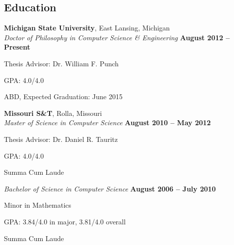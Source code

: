 \documentclass[margin,line]{resume}
\begin{document}
\begin{resume}
    \section{\mysidestyle Education}
    \textbf{Michigan State University}, East Lansing, Michigan \vspace{2mm}\\\vspace{1mm}%
    \textsl{Doctor of Philosophy in Computer Science \& Engineering} \hfill \textbf{ August 2012 -- Present}\vspace{-3mm}\\\vspace{-1mm}%
    \begin{list2}
        \item Thesis Advisor:  Dr. William F. Punch
        \item GPA: 4.0/4.0
        \item ABD, Expected Graduation: June 2015
    \end{list2}\vspace{-1.5mm}
    \textbf{Missouri S\&T}, Rolla, Missouri \vspace{2mm}\\\vspace{1mm}%
    \textsl{Master of Science in Computer Science} \hfill \textbf{ August 2010 -- May 2012}\vspace{-3mm}\\\vspace{-1mm}%
    \begin{list2}
        \item Thesis Advisor:  Dr. Daniel R. Tauritz
        \item GPA: 4.0/4.0
        \item Summa Cum Laude
    \end{list2}\vspace{-1.5mm}
    \textsl{Bachelor of Science in Computer Science} \hfill \textbf{ August 2006 -- July 2010}\vspace{-3mm}\\\vspace{-1mm}%
    \begin{list2}
        \item Minor in Mathematics
        \item GPA: 3.84/4.0 in major, 3.81/4.0 overall
        \item Summa Cum Laude
    \end{list2}\vspace{-1.5mm}




\end{resume}
\end{document}
